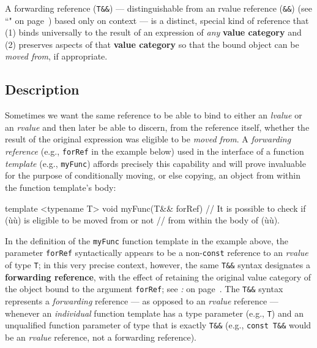 

A forwarding reference (\texttt{T\&\&}) --- distinguishable from an
rvalue reference (\texttt{\&\&}) (see ``" on page~\pageref{Rvalue-References}) based only on context
--- is a distinct, special kind of reference that (1) binds
universally to the result of an expression of \emph{any} \textbf{value
category} and (2) preserves aspects of that \textbf{value category} so
that the bound object can be \emph{moved from}, if appropriate.

\subsection[Description]{Description}\label{description-forwardingref}

Sometimes we want the same reference to be able to bind to either an
\emph{lvalue} or an \emph{rvalue} and then later be able to discern,
from the reference itself, whether the result of the original expression
was eligible to be \emph{moved from}. A \emph{forwarding reference}
(e.g., \texttt{forRef} in the example below) used in the interface of a function
\emph{template} (e.g., \texttt{myFunc}) affords precisely this
capability and will prove invaluable for the purpose of conditionally
moving, or else copying, an object from within the function template's
body:

\begin{emcppslisting}
template <typename T>
void myFunc(T&& forRef)
{
    // It is possible to check if (ù{}ù) is eligible to be moved from or not
    // from within the body of (ù{}ù).
}
\end{emcppslisting}

\noindent In the definition of the \texttt{myFunc} function template in the example above, the
parameter \texttt{forRef} syntactically appears to be a
non-\texttt{const} reference to an \emph{rvalue} of type \texttt{T}; in
this very precise context, however, the same \texttt{T\&\&} syntax
designates a \textbf{forwarding reference}, with the effect of retaining
the original value category of the object bound to the argument
\texttt{forRef}; see \textit{: } on page~\pageref{identifying-forwarding-references}. The \texttt{T\&\&} syntax
represents a \emph{forwarding} reference --- as opposed to an
\emph{rvalue} reference --- whenever an \emph{individual} function template has a type parameter (e.g., \texttt{T}) and
an unqualified function parameter of type that is exactly
\texttt{T\&\&} (e.g., \texttt{const}~\texttt{T\&\&} would be an
  \emph{rvalue} reference, not a forwarding reference).

